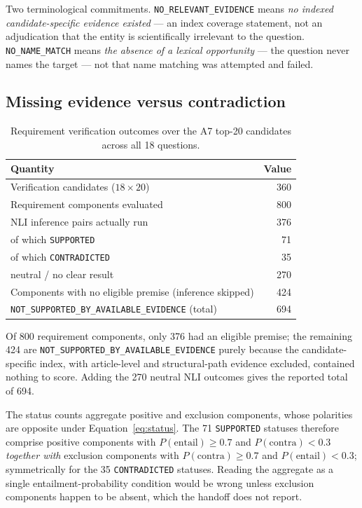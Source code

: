 \documentclass[11pt,a4paper]{article}
\begin{document}
Two terminological commitments. \texttt{NO\_RELEVANT\_EVIDENCE} means \emph{no indexed candidate-specific
evidence existed} --- an index coverage statement, not an adjudication that the entity is scientifically
irrelevant to the question. \texttt{NO\_NAME\_MATCH} means \emph{the absence of a lexical opportunity} ---
the question never names the target --- not that name matching was attempted and failed.

\subsection{Missing evidence versus contradiction}
\label{sec:verifres}

\begin{table}[htbp]
\centering
\caption{Requirement verification outcomes over the A7 top-20 candidates across all 18 questions.}
\label{tab:verif}
\begin{tabular}{lr}
\toprule
Quantity & Value \\
\midrule
Verification candidates ($18 \times 20$) & 360 \\
Requirement components evaluated & 800 \\
NLI inference pairs actually run & 376 \\
\quad of which \texttt{SUPPORTED} & 71 \\
\quad of which \texttt{CONTRADICTED} & 35 \\
\quad neutral / no clear result & 270 \\
Components with no eligible premise (inference skipped) & 424 \\
\texttt{NOT\_SUPPORTED\_BY\_AVAILABLE\_EVIDENCE} (total) & 694 \\
\bottomrule
\end{tabular}
\end{table}

Of 800 requirement components, only 376 had an eligible premise; the remaining 424 are
\texttt{NOT\_SUPPORTED\_BY\_AVAILABLE\_EVIDENCE} purely because the candidate-specific index, with
article-level and structural-path evidence excluded, contained nothing to score. Adding the 270 neutral NLI
outcomes gives the reported total of 694.

The status counts aggregate positive and exclusion components, whose polarities are opposite under
Equation~\eqref{eq:status}. The 71 \texttt{SUPPORTED} statuses therefore comprise positive components with
$P(\text{entail}) \ge 0.7$ and $P(\text{contra}) < 0.3$ \emph{together with} exclusion components with
$P(\text{contra}) \ge 0.7$ and $P(\text{entail}) < 0.3$; symmetrically for the 35 \texttt{CONTRADICTED}
statuses. Reading the aggregate as a single entailment-probability condition would be wrong unless exclusion
components happen to be absent, which the handoff does not report.
\end{document}

